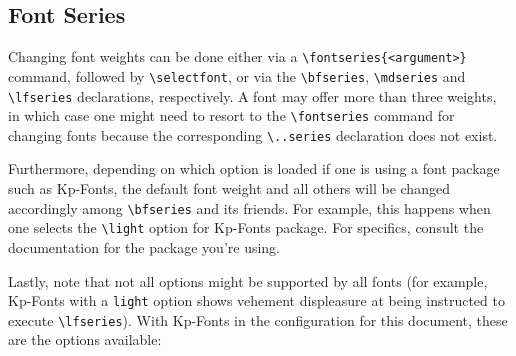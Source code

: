 \documentclass[a4paper,oneside,11pt]{article}
\newcommand\comm[1]{\texttt{\textbackslash#1}}
\newcommand\code[1]{\texttt{#1}}
\begin{document}
\subsection{Font Series}
\label{subsec:font-series}

Changing font weights can be done either via a \comm{fontseries\{<argument>\}}
command,   followed  by   \comm{selectfont},  or   via  the   \comm{bfseries},
\comm{mdseries}  and \comm{lfseries}  declarations,  respectively. A font  may
offer more  than three  weights, in  which case  one might  need to  resort to
the  \comm{fontseries} command  for changing  fonts because  the corresponding
\comm{..series} declaration does not exist.

Furthermore,  depending on  which option  is  loaded if  one is  using a  font
package  such as  Kp-Fonts, the  default font  weight and  all others  will be
changed accordingly  among \comm{bfseries} and its  friends. For example, this
happens when  one selects  the \comm{light}  option for  Kp-Fonts package. For
specifics, consult the documentation for the package you're using.

Lastly,  note that  not  all options  might  be supported  by  all fonts  (for
example,  Kp-Fonts  with  a  \code{light} option  shows  vehement  displeasure
at  being  instructed  to   execute  \comm{lfseries}). With  Kp-Fonts  in  the
configuration for this document, these are the options available:
\end{document}

